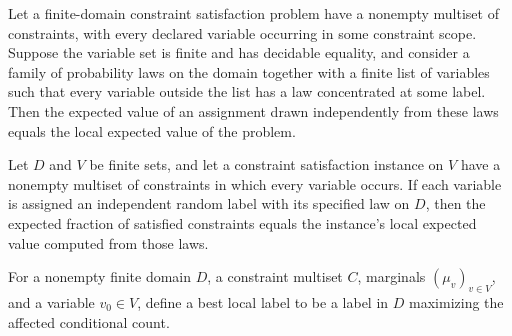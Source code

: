 \begin{theorem}
\label{FABL.CSPInstance.pmfExpectation_value_eq_localExpectedValue_of_pure_off}
\leanok
{}
Let a finite-domain constraint satisfaction problem have a nonempty multiset of
constraints, with every declared variable occurring in some constraint scope. Suppose
the variable set is finite and has decidable equality, and consider a family of
probability laws on the domain together with a finite list of variables such that every
variable outside the list has a law concentrated at some label. Then the expected value
of an assignment drawn independently from these laws equals the local expected value of
the problem.
\end{theorem}

\begin{theorem}
\label{FABL.CSPInstance.expectedPayoff_eq_localExpectedValue}
\leanok
{}
Let $D$ and $V$ be finite sets, and let a constraint satisfaction instance on $V$ have a
nonempty multiset of constraints in which every variable occurs. If each variable is
assigned an independent random label with its specified law on $D$, then the expected
fraction of satisfied constraints equals the instance's local expected value computed
from those laws.
\end{theorem}

\begin{definition}
\label{FABL.CSPInstance.bestLocalLabel}
\leanok
{}
For a nonempty finite domain $D$, a constraint multiset $C$, marginals $(\mu_v)_{v\in
V}$, and a variable $v_0\in V$, define a best local label to be a label in $D$
maximizing the affected conditional count.
\end{definition}

